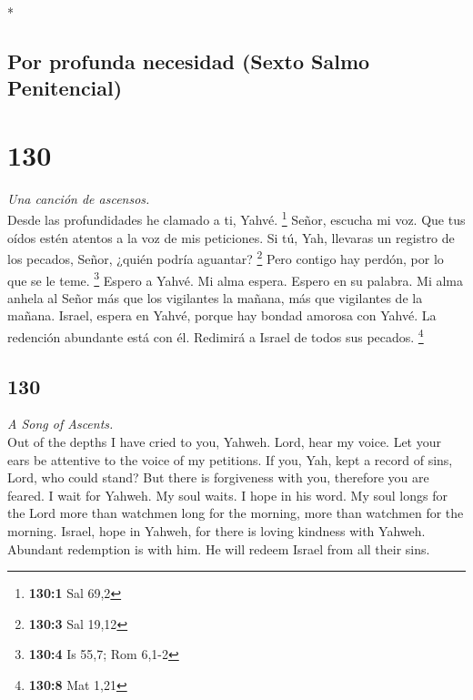 \begin{paracol}{2}
\begin{otherlanguage}{english}
\end{otherlanguage}

\switchcolumn[0]*

\hypertarget{por-profunda-necesidad-sexto-salmo-penitencial}{%
\subsection{Por profunda necesidad (Sexto Salmo
Penitencial)}\label{por-profunda-necesidad-sexto-salmo-penitencial}}

\hypertarget{section-258}{%
\section{130}\label{section-258}}

\emph{Una canción de ascensos.}\\
 Desde las profundidades he clamado a ti, Yahvé.
\footnote{\textbf{130:1} Sal 69,2}  Señor, escucha mi voz.
Que tus oídos estén atentos a la voz de mis peticiones. 
Si tú, Yah, llevaras un registro de los pecados, Señor, ¿quién podría
aguantar? \footnote{\textbf{130:3} Sal 19,12}  Pero
contigo hay perdón, por lo que se le teme. \footnote{\textbf{130:4} Is
  55,7; Rom 6,1-2}  Espero a Yahvé. Mi alma espera. Espero
en su palabra.  Mi alma anhela al Señor más que los
vigilantes la mañana, más que vigilantes de la mañana. 
Israel, espera en Yahvé, porque hay bondad amorosa con Yahvé. La
redención abundante está con él.  Redimirá a Israel de
todos sus pecados. \footnote{\textbf{130:8} Mat 1,21}

\switchcolumn
\begin{otherlanguage}{english}

\hypertarget{section-259}{%
\section{130}\label{section-259}}

\emph{A Song of Ascents.}\\
 Out of the depths I have cried to you, Yahweh.
 Lord, hear my voice. Let your ears be attentive to the
voice of my petitions.  If you, Yah, kept a record of
sins, Lord, who could stand?  But there is forgiveness
with you, therefore you are feared.  I wait for Yahweh. My
soul waits. I hope in his word.  My soul longs for the
Lord more than watchmen long for the morning, more than watchmen for the
morning.  Israel, hope in Yahweh, for there is loving
kindness with Yahweh. Abundant redemption is with him.  He
will redeem Israel from all their sins.


\end{otherlanguage}
\end{paracol}

